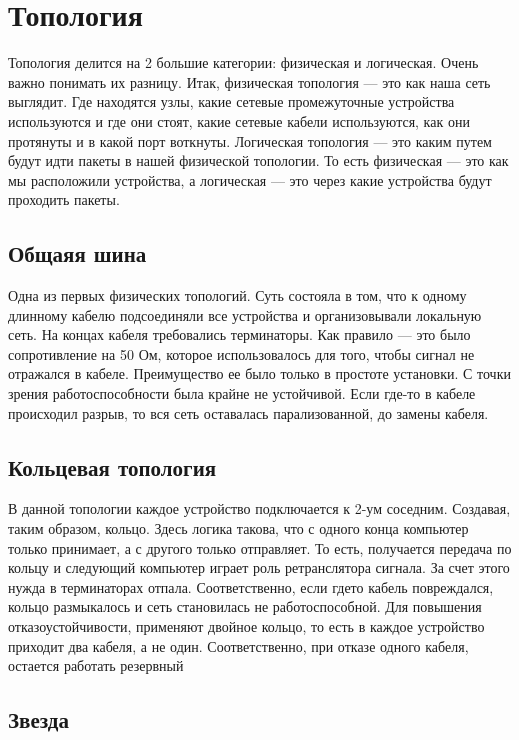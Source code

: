 \section{Топология}

Топология делится на 2 большие категории: физическая и логическая.
Очень важно понимать их разницу. Итак, физическая топология — это как наша сеть выглядит. Где находятся узлы, какие сетевые промежуточные
устройства используются и где они стоят, какие сетевые кабели используются,
как они протянуты и в какой порт воткнуты. Логическая топология — это каким путем будут идти пакеты в нашей физической топологии. То есть физическая — это как мы расположили устройства, а логическая — это через какие
устройства будут проходить пакеты.

\subsection{Общаяя шина}

Одна из первых физических топологий. Суть состояла в том, что к одному длинному кабелю подсоединяли все устройства и организовывали локальную сеть. На концах кабеля требовались терминаторы. Как правило — это было
сопротивление на 50 Ом, которое использовалось для того, чтобы сигнал не отражался в кабеле. Преимущество ее было только в простоте установки. С точки
зрения работоспособности была крайне не устойчивой. Если где-то в кабеле
происходил разрыв, то вся сеть оставалась парализованной, до замены кабеля.

\subsection {Кольцевая топология}

В данной топологии каждое устройство подключается к 2-ум соседним.
Создавая, таким образом, кольцо. Здесь логика такова, что с одного конца
компьютер только принимает, а с другого только отправляет. То есть, получается передача по кольцу и следующий компьютер играет роль ретранслятора
сигнала. За счет этого нужда в терминаторах отпала. Соответственно, если гдето кабель повреждался, кольцо размыкалось и сеть становилась не работоспособной. Для повышения отказоустойчивости, применяют двойное кольцо, то
есть в каждое устройство приходит два кабеля, а не один. Соответственно, при
отказе одного кабеля, остается работать резервный

\subsection{Звезда}

